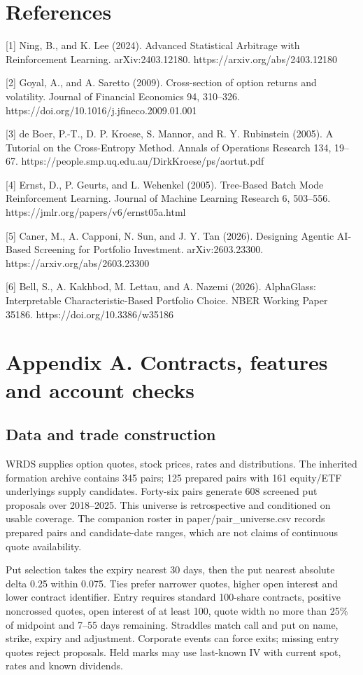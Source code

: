 \documentclass[11pt,letterpaper]{article}
\begin{document}
\clearpage
\section*{References}
[1] Ning, B., and K. Lee (2024). Advanced Statistical Arbitrage with Reinforcement Learning. arXiv:2403.12180. https://arxiv.org/abs/2403.12180

[2] Goyal, A., and A. Saretto (2009). Cross-section of option returns and volatility. Journal of Financial Economics 94, 310--326. https://doi.org/10.1016/j.jfineco.2009.01.001

[3] de Boer, P.-T., D. P. Kroese, S. Mannor, and R. Y. Rubinstein (2005). A Tutorial on the Cross-Entropy Method. Annals of Operations Research 134, 19--67. https://people.smp.uq.edu.au/DirkKroese/ps/aortut.pdf

[4] Ernst, D., P. Geurts, and L. Wehenkel (2005). Tree-Based Batch Mode Reinforcement Learning. Journal of Machine Learning Research 6, 503--556. https://jmlr.org/papers/v6/ernst05a.html

[5] Caner, M., A. Capponi, N. Sun, and J. Y. Tan (2026). Designing Agentic AI-Based Screening for Portfolio Investment. arXiv:2603.23300. https://arxiv.org/abs/2603.23300

[6] Bell, S., A. Kakhbod, M. Lettau, and A. Nazemi (2026). AlphaGlass: Interpretable Characteristic-Based Portfolio Choice. NBER Working Paper 35186. https://doi.org/10.3386/w35186

\clearpage
\appendix
\section*{Appendix A. Contracts, features and account checks}
\subsection*{Data and trade construction}
WRDS supplies option quotes, stock prices, rates and distributions. The inherited formation archive contains 345 pairs; 125 prepared pairs with 161 equity/ETF underlyings supply candidates. Forty-six pairs generate 608 screened put proposals over 2018--2025. This universe is retrospective and conditioned on usable coverage. The companion roster in paper/pair\_universe.csv records prepared pairs and candidate-date ranges, which are not claims of continuous quote availability.

Put selection takes the expiry nearest 30 days, then the put nearest absolute delta 0.25 within 0.075. Ties prefer narrower quotes, higher open interest and lower contract identifier. Entry requires standard 100-share contracts, positive noncrossed quotes, open interest of at least 100, quote width no more than 25\% of midpoint and 7--55 days remaining. Straddles match call and put on name, strike, expiry and adjustment. Corporate events can force exits; missing entry quotes reject proposals. Held marks may use last-known IV with current spot, rates and known dividends.
\end{document}

